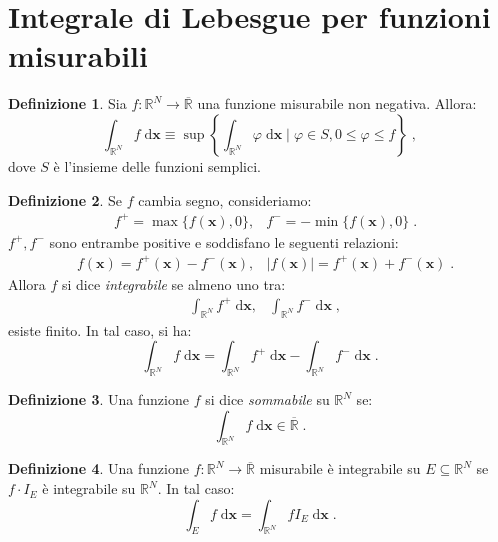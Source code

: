 \documentclass[a4paper,12pt]{report}
\theoremstyle{plain}
\theoremstyle{definition}
\newtheorem{defn}{Definizione}[section]
\theoremstyle{remark}
\newcommand{\diff}[1]{\mathrm{d}#1}
\numberwithin{equation}{section}
\begin{document}
\section{Integrale di Lebesgue per funzioni misurabili}
\begin{defn} Sia $f:\mathbb{R}^N\to\overline{\mathbb{R}}$ una funzione misurabile non negativa. Allora:
\begin{equation}
\int_{\mathbb{R}^N} f\;\diff{\mathbf{x}}\equiv \sup\left\{\int_{\mathbb{R}^N} \varphi\;\diff{\mathbf{x}}\;|\;\varphi\in S, 0\le\varphi\le f\right\}\;,
\end{equation}
dove $S$ è l'insieme delle funzioni semplici.
\end{defn}
\begin{defn}  Se $f$ cambia segno, consideriamo:
\begin{align}
&f^+=\max\{f(\mathbf{x}),0\}, &f^-=-\min\{f(\mathbf{x}),0\}\;.
\end{align}
$f^+,f^-$ sono entrambe positive e soddisfano le seguenti relazioni:
\begin{align}
&f(\mathbf{x})=f^+(\mathbf{x})-f^-(\mathbf{x}), & |f(\mathbf{x})|=f^+(\mathbf{x})+f^-(\mathbf{x})\;.
\end{align}
Allora $f$ si dice \textit{integrabile} se almeno uno tra:
\begin{align}
&\int_{\mathbb{R}^N} f^+\;\diff{\mathbf{x}}, &\int_{\mathbb{R}^N} f^-\;\diff{\mathbf{x}}\;,
\end{align}
esiste finito. In tal caso, si ha:
\begin{equation}
\int_{\mathbb{R}^N} f\;\diff{\mathbf{x}}=\int_{\mathbb{R}^N} f^+\;\diff{\mathbf{x}} -\int_{\mathbb{R}^N} f^-\;\diff{\mathbf{x}}\;.
\end{equation}
\end{defn}
\begin{defn} Una funzione $f$ si dice \textit{sommabile} su $\mathbb{R}^N$ se:
\begin{equation}
\int_{\mathbb{R}^N} f\;\diff{\mathbf{x}} \in \overline{\mathbb{R}}\;.
\end{equation}
\end{defn}
\begin{defn} Una funzione $f:\mathbb{R}^N\to\overline{\mathbb{R}}$ misurabile è integrabile su $E\subseteq\mathbb{R}^N$ se $f\cdot I_E$ è integrabile su $\mathbb{R}^N$. In tal caso:
\begin{equation}
\int_E f\;\diff{\mathbf{x}}=\int_{\mathbb{R}^N} fI_E\;\diff{\mathbf{x}}\;.
\end{equation}
\end{defn}
\end{document}

